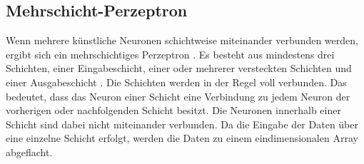 \subsection{Mehrschicht-Perzeptron}
\label{sec:mehrperz}
Wenn mehrere künstliche Neuronen schichtweise miteinander verbunden werden, ergibt sich ein mehrschichtiges Perzeptron \cite{RevModPhys.34.123}\cite{Rosenblatt.1958}. Es besteht aus mindestens drei Schichten, einer Eingabeschicht, einer oder mehrerer versteckten Schichten und einer Ausgabeschicht \cite{GARDNER19982627}. Die Schichten werden in der Regel voll verbunden. Das bedeutet, dass das Neuron einer Schicht eine Verbindung zu jedem Neuron der vorherigen oder nachfolgenden Schicht besitzt. Die Neuronen innerhalb einer Schicht sind dabei nicht miteinander verbunden. Da die Eingabe der Daten über eine einzelne Schicht erfolgt, werden die Daten zu einem eindimensionalen Array abgeflacht.
